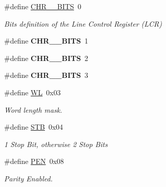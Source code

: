 \begin{DoxyCompactItemize}
\mbox{\label{group__i386__uart_ga72773676c87f5d641c40cae5f9671d83}} 
\#define \mbox{\hyperlink{group__i386__uart_ga72773676c87f5d641c40cae5f9671d83}{C\+H\+R\+\_\+\_\+\+B\+I\+TS}}~0
\begin{DoxyCompactList}\small\item\em Bits definition of the Line Control Register (L\+CR) \end{DoxyCompactList}\item 
\mbox{\label{group__i386__uart_gacbaecb8312af3357da81e3a2e3577fd2}} 
\#define {\bfseries C\+H\+R\+\_\+\_\+\+B\+I\+TS}~1
\item 
\mbox{\label{group__i386__uart_gafce77e1ff111f684e3cf9a615e25fd18}} 
\#define {\bfseries C\+H\+R\+\_\+\_\+\+B\+I\+TS}~2
\item 
\mbox{\label{group__i386__uart_ga05303fbba275bb5f96b92ad939b765a7}} 
\#define {\bfseries C\+H\+R\+\_\+\_\+\+B\+I\+TS}~3
\item 
\mbox{\label{group__i386__uart_ga5d0674318ee8a7200066fb4e969a585d}} 
\#define \mbox{\hyperlink{group__i386__uart_ga5d0674318ee8a7200066fb4e969a585d}{WL}}~0x03
\begin{DoxyCompactList}\small\item\em Word length mask. \end{DoxyCompactList}\item 
\mbox{\label{group__i386__uart_ga7c5c7ce359dc4d95c31c074ebd6c28ac}} 
\#define \mbox{\hyperlink{group__i386__uart_ga7c5c7ce359dc4d95c31c074ebd6c28ac}{S\+TB}}~0x04
\begin{DoxyCompactList}\small\item\em 1 Stop Bit, otherwise 2 Stop Bits \end{DoxyCompactList}\item 
\mbox{\label{group__i386__uart_gaa858f2fbc6c6e9ddf6eabb0f22d1d136}} 
\#define \mbox{\hyperlink{group__i386__uart_gaa858f2fbc6c6e9ddf6eabb0f22d1d136}{P\+EN}}~0x08
\begin{DoxyCompactList}\small\item\em Parity Enabled. \end{DoxyCompactList}\item 

\end{DoxyCompactItemize}
